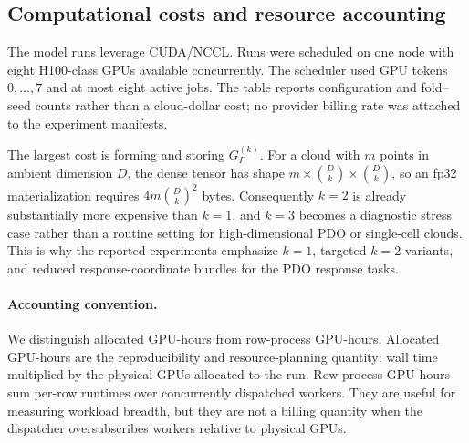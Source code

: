 \documentclass{article}
\theoremstyle{remark}
\theoremstyle{plain}
\begin{document}
\subsection{Computational costs and resource accounting}
\label{subsec:computational-costs}

 The model runs leverage CUDA/NCCL. Runs were scheduled on one node with eight H100-class GPUs available concurrently. The scheduler used GPU tokens \(0,\ldots,7\) and at most eight active jobs. The table reports configuration and fold--seed counts rather than a cloud-dollar cost; no provider billing rate was attached to the experiment manifests.

\begin{tcolorbox}[
enhanced, breakable, colback=gray!4, colframe=black!45, boxrule=0.4pt, arc=2pt, left=5pt, right=5pt, top=4pt, bottom=4pt, title=Computational remark ] The largest cost is forming and storing \(G_P^{(k)}\). For a cloud with \(m\) points in ambient dimension \(D\), the dense tensor has shape \(m\times {D\choose k}\times {D\choose k}\), so an fp32 materialization requires \(4m{D\choose k}^{2}\) bytes. Consequently \(k=2\) is already substantially more expensive than \(k=1\), and \(k=3\) becomes a diagnostic stress case rather than a routine setting for high-dimensional PDO or single-cell clouds. This is why the reported experiments emphasize \(k=1\), targeted \(k=2\) variants, and reduced response-coordinate bundles for the PDO response tasks.
\end{tcolorbox}

\paragraph{Accounting convention.} We distinguish allocated GPU-hours from row-process GPU-hours. Allocated GPU-hours are the reproducibility and resource-planning quantity: wall time multiplied by the physical GPUs allocated to the run. Row-process GPU-hours sum per-row runtimes over concurrently dispatched workers. They are useful for measuring workload breadth, but they are not a billing quantity when the dispatcher oversubscribes workers relative to physical GPUs.
\end{document}
